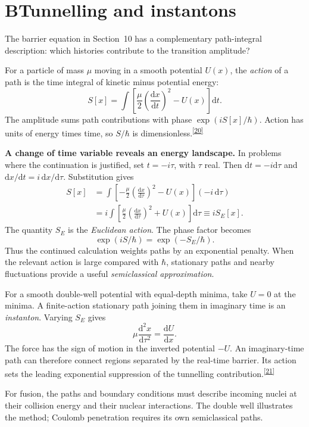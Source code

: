 \documentclass[11pt]{article}
\newcommand{\refn}[1]{\textsuperscript{\hyperlink{src#1}{[#1]}}}
\newcommand{\dd}{\mathrm d}
\begin{document}
\section*{B\quad Tunnelling and instantons}

The barrier equation in Section~10 has a complementary path-integral description: which histories contribute to the transition amplitude?

For a particle of mass $\mu$ moving in a smooth potential $U(x)$, the
\emph{action} of a path is the time integral of kinetic minus potential energy:
\[
S[x]=\int\left[\frac{\mu}{2}\left(\frac{\dd x}{\dd t}\right)^2-U(x)\right]\dd t.
\]
The amplitude sums path contributions with phase $\exp(iS[x]/\hbar)$. Action has units of energy times time, so $S/\hbar$ is dimensionless.\refn{20}

\textbf{A change of time variable reveals an energy landscape.}
In problems where the continuation is justified, set $t=-i\tau$, with
$\tau$ real. Then $\dd t=-i\dd\tau$ and
$\dd x/\dd t=i\,\dd x/\dd\tau$. Substitution gives
\begin{align*}
S[x]
&=\int\left[-\frac{\mu}{2}\left(\frac{\dd x}{\dd\tau}\right)^2-U(x)\right](-i\,\dd\tau)\\
&=i\int\left[\frac{\mu}{2}\left(\frac{\dd x}{\dd\tau}\right)^2+U(x)\right]\dd\tau
\equiv iS_E[x].
\end{align*}
The quantity $S_E$ is the \emph{Euclidean action}. The phase factor becomes
\[
\exp(iS/\hbar)=\exp(-S_E/\hbar).
\]
Thus the continued calculation weights paths by an exponential penalty.
When the relevant action is large compared with $\hbar$, stationary paths
and nearby fluctuations provide a useful \emph{semiclassical approximation}.

For a smooth double-well potential with equal-depth minima, take $U=0$ at
the minima. A finite-action stationary path joining them in imaginary time
is an \emph{instanton}. Varying $S_E$ gives
\[
\mu\frac{\dd^2x}{\dd\tau^2}=\frac{\dd U}{\dd x}.
\]
The force has the sign of motion in the inverted potential $-U$.
An imaginary-time path can therefore connect regions separated by the
real-time barrier. Its action sets the leading exponential suppression of
the tunnelling contribution.\refn{21}

For fusion, the paths and boundary conditions must describe incoming nuclei at their collision energy and their nuclear interactions. The double well illustrates the method; Coulomb penetration requires its own semiclassical paths.
\end{document}
